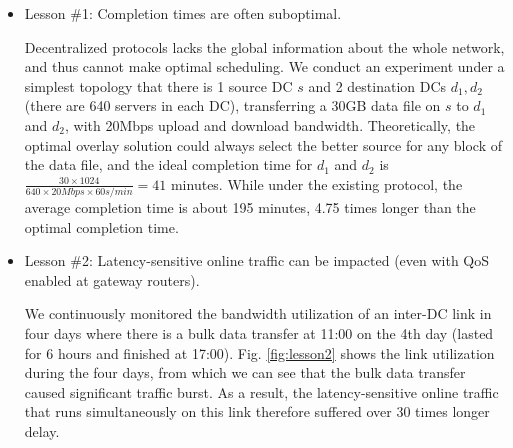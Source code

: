 \begin{itemize}
%

\item Lesson \#1: Completion times are often suboptimal.

Decentralized protocols lacks the global information about the whole network, and thus cannot make optimal scheduling. We conduct an experiment under a simplest topology that there is 1 source DC $s$ and 2 destination DCs $d_1, d_2$ (there are 640 servers in each DC), transferring a 30GB data file on $s$ to $d_1$ and $d_2$, with 20Mbps upload and download bandwidth. Theoretically, the optimal overlay solution could always select the better source for any block of the data file, and the ideal completion time for $d_1$ and $d_2$ is $\frac{30\times 1024}{640\times 20Mbps \times 60s/min} = 41$ minutes. While under the existing protocol, the average completion time is about 195 minutes, 4.75 times longer than the optimal completion time.

\item Lesson \#2: Latency-sensitive online traffic can be impacted (even with QoS enabled at gateway routers).

We continuously monitored the bandwidth utilization of an inter-DC link in four days where there is a bulk data transfer at 11:00 on the 4th day (lasted for 6 hours and finished at 17:00). Fig. \ref{fig:lesson2} shows the link utilization during the four days, from which we can see that the bulk data transfer caused significant traffic burst. As a result, the latency-sensitive online traffic that runs simultaneously on this link therefore suffered over 30 times longer delay.

\end{itemize}

